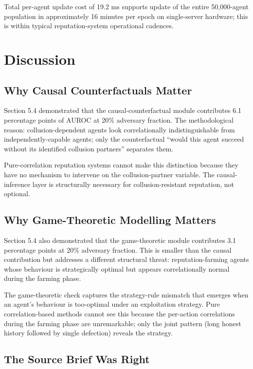 \documentclass[sigconf,nonacm]{acmart}
\begin{document}
Total per-agent update cost of 19.2 ms supports update of the entire
50{,}000-agent population in approximately 16 minutes per epoch on
single-server hardware; this is within typical reputation-system
operational cadences.

\section{Discussion}

\subsection{Why Causal Counterfactuals Matter}

Section 5.4 demonstrated that the causal-counterfactual module
contributes 6.1 percentage points of AUROC at 20\% adversary
fraction. The methodological reason: collusion-dependent agents
look correlationally indistinguishable from independently-capable
agents; only the counterfactual ``would this agent succeed without
its identified collusion partners'' separates them.

Pure-correlation reputation systems cannot make this distinction
because they have no mechanism to intervene on the collusion-partner
variable. The causal-inference layer is structurally necessary
for collusion-resistant reputation, not optional.

\subsection{Why Game-Theoretic Modelling Matters}

Section 5.4 also demonstrated that the game-theoretic module
contributes 3.1 percentage points at 20\% adversary fraction.
This is smaller than the causal contribution but addresses a
different structural threat: reputation-farming agents whose
behaviour is strategically optimal but appears
correlationally normal during the farming phase.

The game-theoretic check captures the strategy-rule mismatch
that emerges when an agent's behaviour is too-optimal under an
exploitation strategy. Pure correlation-based methods cannot see
this because the per-action correlations during the farming phase
are unremarkable; only the joint pattern (long honest history
followed by single defection) reveals the strategy.

\subsection{The Source Brief Was Right}
\end{document}
